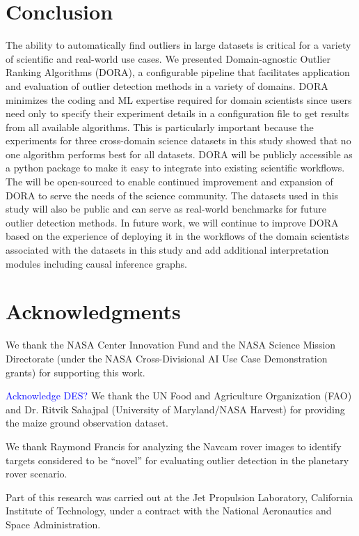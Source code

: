 \documentclass[letterpaper]{article} %
\newcommand{\todo}[1]{\textcolor{blue}{#1}}
\begin{document}
\section{Conclusion}
The ability to automatically find outliers in large datasets is critical
for a variety of scientific and real-world use cases. 
We presented Domain-agnostic Outlier Ranking Algorithms (DORA),
a configurable pipeline that facilitates application and evaluation of
outlier detection methods in a variety of domains. DORA minimizes the
coding and ML expertise required for domain scientists since users
need only to specify their experiment details in a configuration file
to get results from all available algorithms. This is particularly important
because the experiments for three cross-domain science datasets in this
study showed that no one algorithm performs best for all datasets.
DORA will be publicly accessible as a python package to make it
easy to integrate into existing scientific workflows. 
The will be
open-sourced to enable continued improvement and expansion of DORA
to serve the needs of the science community. The datasets used in this
study will also be public and can serve as real-world benchmarks 
for future outlier detection methods. In future work, we will
continue to improve DORA based on the experience of deploying it in
the workflows of the domain scientists associated with the datasets in
this study and add additional interpretation modules 
including causal inference graphs.




\section{Acknowledgments}
We thank the NASA Center Innovation Fund and the NASA Science Mission 
Directorate (under the NASA Cross-Divisional AI Use Case Demonstration grants)
 for supporting this work.

\todo{Acknowledge DES?}
We thank the UN Food and Agriculture Organization (FAO) and Dr. Ritvik Sahajpal
(University of Maryland/NASA Harvest) for providing the maize ground
 observation dataset.

We thank Raymond Francis for analyzing the Navcam rover images to
identify targets considered to be ``novel'' for evaluating outlier
detection in the planetary rover scenario.

Part of this research was carried out at the Jet Propulsion
Laboratory, California Institute of Technology, under a contract with
the National Aeronautics and Space Administration.
\end{document}
